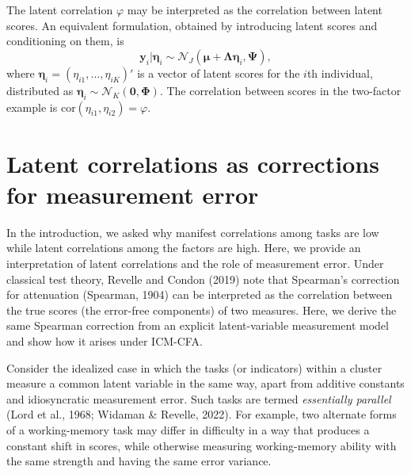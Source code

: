 \documentclass[
  american,
  man,floatsintext]{apa7}
\begin{document}
The latent correlation \(\varphi\) may be interpreted as the correlation between latent scores. An equivalent formulation, obtained by introducing latent scores and conditioning on them, is
\[
\pmb{y}_i|\pmb{\eta}_i \sim \mathcal{N}_J(\pmb{\mu}+\pmb{\Lambda}\pmb{\eta}_i, \pmb{\Psi}),
\]
where \(\pmb{\eta}_i=(\eta_{i1},\ldots,\eta_{iK})'\) is a vector of latent scores for the \(i\)th individual, distributed as \(\pmb{\eta}_i\sim \mathcal{N}_K(\pmb{0},\pmb{\Phi})\). The correlation between scores in the two-factor example is \(\mathrm{cor}(\eta_{i1},\eta_{i2}) = \varphi\).

\section{Latent correlations as corrections for measurement error}\label{latent-correlations-as-corrections-for-measurement-error}

In the introduction, we asked why manifest correlations among tasks are low while latent correlations among the factors are high. Here, we provide an interpretation of latent correlations and the role of measurement error. Under classical test theory, Revelle and Condon (2019) note that Spearman's correction for attenuation (Spearman, 1904) can be interpreted as the correlation between the true scores (the error-free components) of two measures. Here, we derive the same Spearman correction from an explicit latent-variable measurement model and show how it arises under ICM-CFA.

Consider the idealized case in which the tasks (or indicators) within a cluster measure a common latent variable in the same way, apart from additive constants and idiosyncratic measurement error. Such tasks are termed \emph{essentially parallel} (Lord et al., 1968; Widaman \& Revelle, 2022). For example, two alternate forms of a working-memory task may differ in difficulty in a way that produces a constant shift in scores, while otherwise measuring working-memory ability with the same strength and having the same error variance.
\end{document}
